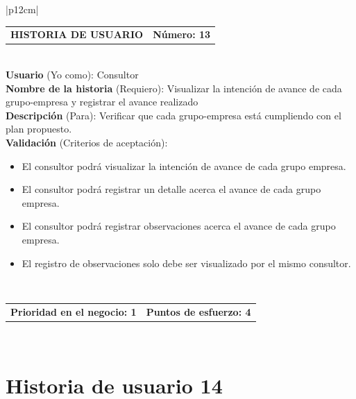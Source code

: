 \documentclass[11pt,letterpaper]{report}
\begin{document}
	\begin{center}	
		\begin{tabular}{|p{12cm}|}
			\hline
			\begin{tabular}{c|c}
				\textbf{HISTORIA DE USUARIO} & \textbf{Número: 13} \\
			\end{tabular} \\ \hline
			\textbf{Usuario} (Yo como): Consultor \\ \hline
			\textbf{Nombre de la historia} (Requiero): Visualizar la intención de avance de cada grupo-empresa y registrar el avance realizado \\ \hline
			\textbf{Descripción} (Para): Verificar que cada grupo-empresa está cumpliendo con el plan propuesto. \\ \hline
			\textbf{Validación} (Criterios de aceptación): \\
			\begin{minipage}{12cm}
				\begin{itemize}
					\item El consultor podrá visualizar la intención de avance de cada grupo empresa.
					\item El consultor podrá registrar un detalle acerca el avance de cada grupo empresa.
					\item El consultor podrá registrar observaciones acerca el avance de cada grupo empresa.
					\item El registro de observaciones solo debe ser visualizado por el mismo consultor.
				\end{itemize}
			\end{minipage} \\ \hline
			\begin{tabular}{c|c}
				\textbf{Prioridad en el negocio: 1} & \textbf{Puntos de esfuerzo: 4} \\
			\end{tabular} \\ \hline
		\end{tabular}
	\end{center}
	
	\section{Historia de usuario 14}
	
\end{document}
